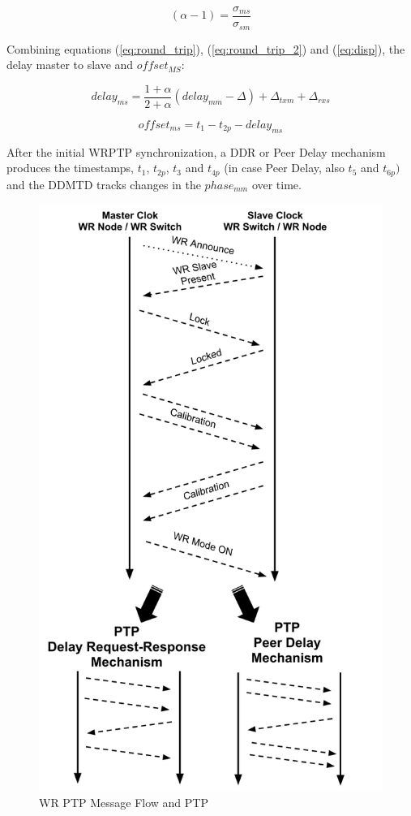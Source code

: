 \begin{equation}
    \label{eq:disp}
    (\alpha-1) = \frac{\sigma_{ms}}{\sigma_{sm}}
\end{equation}

Combining equations (\ref{eq:round_trip}), (\ref{eq:round_trip_2}) and
(\ref{eq:disp}), the delay master to slave and $offset_{MS}$:

\begin{equation}
    \label{eq:delayms}
     delay_{ms} = \frac{1+ \alpha}{2+ \alpha}(delay_{mm} - \Delta)+ \Delta_{txm} + \Delta_{rxs} 
\end{equation}

\begin{equation}
    \label{eq:offsetms}
    offset_{ms} = t_{1} - t_{2p} - delay_{ms}
\end{equation}


After the initial WRPTP synchronization, a DDR or Peer Delay mechanism produces the 
timestamps, $t_{1}$, $t_{2p}$, $t_{3}$ and $t_{4p}$ (in case Peer Delay, also
$t_{5}$ and $t_{6p})$ and the DDMTD tracks changes in the $phase_{mm}$ over time. 

\begin{figure}[!t]
\centering
\includegraphics[scale=0.25]{fig/wr_ptp.png}
\caption{WR PTP Message Flow and PTP}
\label{fig:wr_ptp}
\end{figure}


